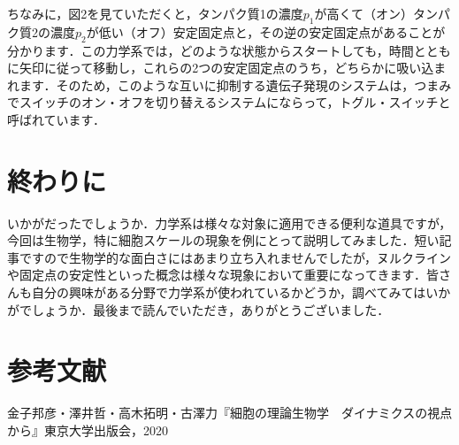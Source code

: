 \documentclass[platex,dvipdfmx, a5paper]{jlreq}			%
\begin{document}
ちなみに，図2を見ていただくと，タンパク質1の濃度$p_1$が高くて（オン）タンパク質2の濃度$p_2$が低い（オフ）安定固定点と，その逆の安定固定点があることが分かります．この力学系では，どのような状態からスタートしても，時間とともに矢印に従って移動し，これらの2つの安定固定点のうち，どちらかに吸い込まれます．そのため，このような互いに抑制する遺伝子発現のシステムは，つまみでスイッチのオン・オフを切り替えるシステムにならって，トグル・スイッチと呼ばれています．
\section{終わりに}
いかがだったでしょうか．力学系は様々な対象に適用できる便利な道具ですが，今回は生物学，特に細胞スケールの現象を例にとって説明してみました．短い記事ですので生物学的な面白さにはあまり立ち入れませんでしたが，ヌルクラインや固定点の安定性といった概念は様々な現象において重要になってきます．皆さんも自分の興味がある分野で力学系が使われているかどうか，調べてみてはいかがでしょうか．最後まで読んでいただき，ありがとうございました．
\section{参考文献}
金子邦彦・澤井哲・高木拓明・古澤力『細胞の理論生物学　ダイナミクスの視点から』東京大学出版会，2020
\end{document}

